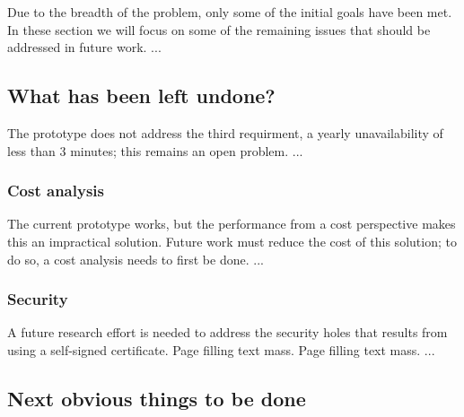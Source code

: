



Due to the breadth of the problem, only some of the initial goals have been
met. In these section we will focus on some of the remaining issues that
should be addressed in future work. ...


\subsection{What has been left undone?}
\label{what-has-been-left-undone}


The prototype does not address the third requirment, \ie a yearly unavailability of less than 3 minutes; this remains an open problem. ...


\subsubsection{Cost analysis}




The current prototype works, but the performance from a cost perspective makes this an impractical solution. Future work must reduce the cost of this solution; to do so, a cost analysis needs to first be done. ...


\subsubsection{Security}




A future research effort is needed to address the security holes that results from using a self-signed certificate. Page filling text mass. Page filling text mass. ...


\subsection{Next obvious things to be done}



